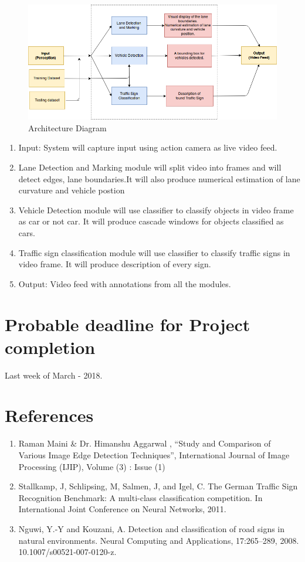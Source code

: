\documentclass[12pt,a4paper,final]{article}
\begin{document}
\begin{flushleft}
\begin{figure}[H]
\begin{center}
\includegraphics[scale=0.5]{Architecture.png}
\caption{Architecture Diagram}
\end{center}
\end{figure}
\begin{enumerate}
\item
Input: System will capture input using action camera as live video feed.
\item
Lane Detection and Marking module will split video into frames and will detect edges, lane boundaries.It will also produce numerical estimation of lane curvature and vehicle postion

\item
Vehicle Detection module will use classifier to classify objects in video frame as car or not car. It will produce cascade windows for objects classified as cars.


\item
Traffic sign classification module will use classifier to classify traffic signs in video frame. It will produce description of every sign.

\item
Output: Video feed with annotations from all the modules.


\end{enumerate}

\newpage
\noindent
\section{Probable deadline for Project completion}
Last week of March - 2018.

\section{References}
\begin{enumerate}
\item
Raman Maini \& Dr. Himanshu Aggarwal , “Study and Comparison of Various Image Edge Detection Techniques”, International Journal of Image Processing (IJIP), Volume (3) : Issue (1)
\item
Stallkamp, J, Schlipsing, M, Salmen, J, and Igel, C. The German Traffic Sign Recognition Benchmark: A multi-class classification competition. In International Joint Conference on Neural Networks, 2011.
\item 
Nguwi, Y.-Y and Kouzani, A. Detection and classification of road signs in natural environments. Neural Computing and Applications, 17:265–289, 2008. 10.1007/s00521-007-0120-z.


\end{enumerate}
\end{flushleft}
\end{document}
